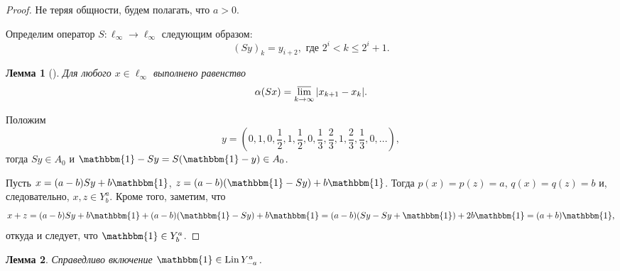 \documentclass[a4paper,14pt]{article} %
\theoremstyle{plain}
\newtheorem{lemma}{Лемма}[section]
\begin{document}
\begin{proof}
	Не теряя общности, будем полагать, что $a>0$.

	Определим оператор $S:\ell_\infty \to \ell_\infty$ следующим образом:
	\begin{equation}\label{operator_S}
		(Sy)_k = y_{i+2}, \mbox{ где } 2^i < k \leq 2^i+1
		.
	\end{equation}
	\begin{lemma}[{\cite{our-vzms-2018}}]
		Для любого $x\in \ell_\infty$ выполнено равенство
		\begin{equation}\label{alpha_S}
			\alpha(Sx) = \varlimsup_{k\to\infty} |x_{k+1} - x_{k}|
			.
		\end{equation}
	\end{lemma}
	Положим
	\begin{equation}
		\label{eq:y_for_s_alpha}
		y = \left(0,1,0,\frac{1}{2},1,\frac{1}{2},0,\frac{1}{3},\frac{2}{3},1,\frac{2}{3},\frac{1}{3},0,...\right)
		,
	\end{equation}
	тогда $Sy\in A_0$ и $\mathbbm{1}-Sy = S(\mathbbm{1}-y)\in A_0$.

	Пусть $x=(a-b)Sy+b\mathbbm{1}$, $z=(a-b)(\mathbbm{1}-Sy)+b\mathbbm{1}$.
	Тогда $p(x)=p(z)=a$, $q(x)=q(z)=b$ и, следовательно, $x,z\in Y^a_b$.
	Кроме того, заметим, что
	\begin{equation}
		x+z = (a-b)Sy+b\mathbbm{1} + (a-b)(\mathbbm{1}-Sy)+b\mathbbm{1}
		=
		(a-b)(Sy-Sy+\mathbbm{1}) + 2 b\mathbbm{1} = (a+b)\mathbbm{1}
		,
	\end{equation}
	откуда и следует, что $\mathbbm{1}\in Y^a_b$.
\end{proof}


\begin{lemma}
	\label{lem:const_Lin_alpha_0_a_eq_-b}
	Справедливо включение
	$\mathbbm{1}\in \operatorname{Lin} Y^a_{-a}$.
\end{lemma}
\end{document}
